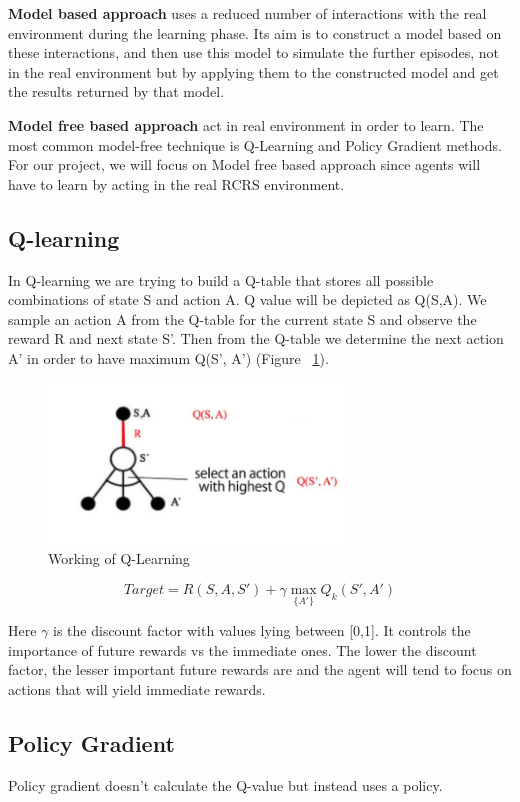\documentclass[12pt]{report}
\begin{document}
\textbf{Model based approach} uses a reduced number of interactions with the real environment during the learning phase. Its aim is to construct a model based on these interactions, and then use this model to simulate the further episodes, not in the real environment but by applying them to the constructed model and get the results returned by that model.

\textbf{Model free based approach} act in real environment in order to learn. The most common model-free technique is Q-Learning and Policy Gradient methods. For our project, we will focus on Model free based approach since agents will have to learn by acting in the real RCRS environment. 

\subsection{Q-learning} In Q-learning we are trying to build a Q-table that stores all possible combinations of state S and action A. Q value will be depicted as Q(S,A). We sample an action A from the Q-table for the current state S and observe the reward R and next state S'. Then from the Q-table we determine the next action A' in order to have maximum Q(S', A') (Figure ~\ref{fig:QLearning}). 

\begin{figure}[!h]
    \centering
    \includegraphics[width=8cm]{QLearning.png}
    \caption{Working of Q-Learning}
    \label{fig:QLearning}
\end{figure}

\[ Target = R(S,A,S') + \gamma \max_{\{A'\}} Q_k (S', A')  \] 

Here $\gamma$ is the discount factor with values lying between [0,1]. It controls the importance of future rewards vs the immediate ones. The lower the discount factor, the lesser important future rewards are and the agent will tend to focus on actions that will yield immediate rewards.    

\subsection{Policy Gradient} Policy gradient doesn't calculate the Q-value but instead uses a policy. 
\end{document}
